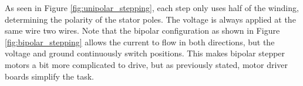 As seen in Figure \ref{fig:unipolar_stepping}, each step only uses half of the winding, determining the polarity of the stator poles. The voltage is always applied at the same wire two wires.
\newpage
Note that the bipolar configuration as shown in Figure \ref{fig:bipolar_stepping} allows the current to flow in both directions, but the voltage and ground continuously switch positions. This makes bipolar stepper motors a bit more complicated to drive, but as previously stated, motor driver boards simplify the task.

\begin{figure}[htp] 
    \centering
    \hfill
    \hfill
   	\hfill
\end{figure}

